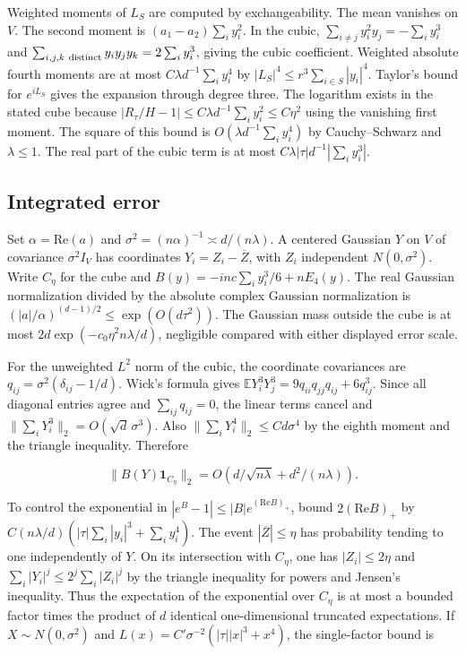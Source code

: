 Weighted moments of $L_S$ are computed by exchangeability. The mean vanishes on $V$. The second moment is $(a_1-a_2)\sum_i y_i^2$. In the cubic, $\sum_{i\ne j}y_i^2 y_j=-\sum_i y_i^3$ and $\sum_{i,j,k\ {\rm distinct}}y_i y_j y_k=2\sum_i y_i^3$, giving the cubic coefficient. Weighted absolute fourth moments are at most $C\lambda d^{-1}\sum_i y_i^4$ by $|L_S|^4\le r^3\sum_{i\in S}|y_i|^4$. Taylor's bound for $e^{iL_S}$ gives the expansion through degree three. The logarithm exists in the stated cube because $|R_\tau/H-1|\le C\lambda d^{-1}\sum_i y_i^2\le C\eta^2$ using the vanishing first moment. The square of this bound is $O(\lambda d^{-1}\sum_i y_i^4)$ by Cauchy--Schwarz and $\lambda\le1$. The real part of the cubic term is at most $C\lambda|\tau|d^{-1}|\sum_i y_i^3|$.

\subsection{Integrated error}

Set $\alpha=\mathrm{Re}(a)$ and $\sigma^2=(n\alpha)^{-1}\asymp d/(n\lambda)$. A centered Gaussian $Y$ on $V$ of covariance $\sigma^2 I_V$ has coordinates $Y_i=Z_i-\overline Z$, with $Z_i$ independent $N(0,\sigma^2)$. Write $C_\eta$ for the cube and $B(y)=-inc\sum_i y_i^3/6+nE_4(y)$. The real Gaussian normalization divided by the absolute complex Gaussian normalization is $(|a|/\alpha)^{(d-1)/2}\le\exp(O(d\tau^2))$. The Gaussian mass outside the cube is at most $2d\exp(-c_0\eta^2 n\lambda/d)$, negligible compared with either displayed error scale.

For the unweighted $L^2$ norm of the cubic, the coordinate covariances are $q_{ij}=\sigma^2(\delta_{ij}-1/d)$. Wick's formula gives $\mathbb E Y_i^3Y_j^3=9q_{ii}q_{jj}q_{ij}+6q_{ij}^3$. Since all diagonal entries agree and $\sum_{ij}q_{ij}=0$, the linear terms cancel and $\|\sum_iY_i^3\|_2=O(\sqrt d\,\sigma^3)$. Also $\|\sum_iY_i^4\|_2\le C d\sigma^4$ by the eighth moment and the triangle inequality. Therefore

\begin{equation*}
\|B(Y)\mathbf 1_{C_\eta}\|_2
=O(d/\sqrt{n\lambda}+d^2/(n\lambda)).
\end{equation*}

To control the exponential in $|e^B-1|\le |B| e^{(\mathrm{Re} B)_+}$, bound $2(\mathrm{Re} B)_+$ by $C(n\lambda/d)(|\tau|\sum_i|y_i|^3+\sum_i y_i^4)$. The event $|\overline Z|\le\eta$ has probability tending to one independently of $Y$. On its intersection with $C_\eta$, one has $|Z_i|\le2\eta$ and $\sum_i|Y_i|^j\le 2^j\sum_i|Z_i|^j$ by the triangle inequality for powers and Jensen's inequality. Thus the expectation of the exponential over $C_\eta$ is at most a bounded factor times the product of $d$ identical one-dimensional truncated expectations. If $X\sim N(0,\sigma^2)$ and $L(x)=C'\sigma^{-2}(|\tau||x|^3+x^4)$, the single-factor bound is


